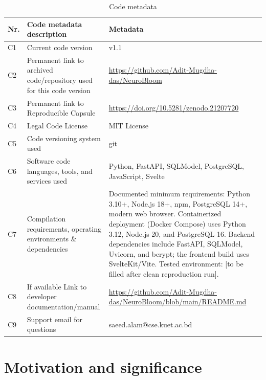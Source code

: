 \documentclass[preprint,12pt,a4paper]{elsarticle}
\begin{document}
\begin{table}[!h]
\centering
\begin{tabular}{|l|p{6.5cm}|p{6.5cm}|}
\hline
\textbf{Nr.} & \textbf{Code metadata description} & \textbf{Metadata} \\
\hline

C1 & Current code version & v1.1 \\
\hline

C2 & Permanent link to archived code/repository used for this code version &
\url{https://github.com/Adit-Mugdha-das/NeuroBloom} \\
\hline

C3 & Permanent link to Reproducible Capsule &
\url{https://doi.org/10.5281/zenodo.21207720} \\
\hline

C4 & Legal Code License & MIT License \\
\hline

C5 & Code versioning system used & git \\
\hline

C6 & Software code languages, tools, and services used &
Python, FastAPI, SQLModel, PostgreSQL, JavaScript, Svelte \\
\hline

C7 & Compilation requirements, operating environments \& dependencies &
Documented minimum requirements: Python 3.10+, Node.js 18+, npm,
PostgreSQL 14+, modern web browser. Containerized deployment (Docker
Compose) uses Python 3.12, Node.js 20, and PostgreSQL 16. Backend
dependencies include FastAPI, SQLModel, Uvicorn, and bcrypt; the frontend
build uses SvelteKit/Vite. Tested environment: [to be filled after clean
reproduction run]. \\
\hline

C8 & If available Link to developer documentation/manual &
\url{https://github.com/Adit-Mugdha-das/NeuroBloom/blob/main/README.md} \\
\hline

C9 & Support email for questions &
saeed.alam@cse.kuet.ac.bd \\
\hline

\end{tabular}
\caption{Code metadata}
\label{codeMetadata}
\end{table}

\section{Motivation and significance}
\end{document}
